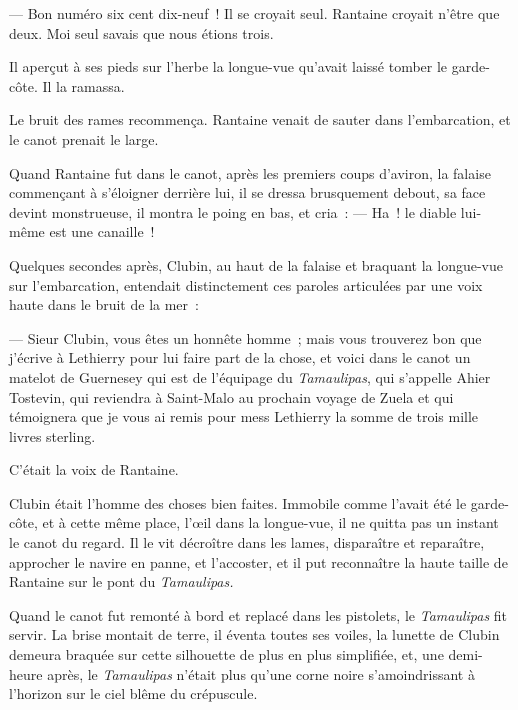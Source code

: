 \documentclass[french,twoside]{book} %
\begin{document}
— Bon numéro six cent dix-neuf ! Il se croyait seul. Rantaine croyait n’être que deux. Moi seul savais que nous étions trois.\par
Il aperçut à ses pieds sur l’herbe la longue-vue qu’avait laissé tomber le garde-côte. Il la ramassa.\par
Le bruit des rames recommença. Rantaine venait de sauter dans l’embarcation, et le canot prenait le large.\par
Quand Rantaine fut dans le canot, après les premiers coups d’aviron, la falaise commençant à s’éloigner derrière lui, il se dressa brusquement debout, sa face devint monstrueuse, il montra le poing en bas, et cria : — Ha ! le diable lui-même est une canaille !\par
Quelques secondes après, Clubin, au haut de la falaise et braquant la longue-vue sur l’embarcation, entendait distinctement ces paroles articulées par une voix haute dans le bruit de la mer :\par
— Sieur Clubin, vous êtes un honnête homme ; mais vous trouverez bon que j’écrive à Lethierry pour lui faire part de la chose, et voici dans le canot un matelot de Guernesey qui est de l’équipage du \emph{Tamaulipas}, qui s’appelle Ahier Tostevin, qui reviendra à Saint-Malo au prochain voyage de Zuela et qui témoignera  que je vous ai remis pour mess Lethierry la somme de trois mille livres sterling.\par
C’était la voix de Rantaine.\par
Clubin était l’homme des choses bien faites. Immobile comme l’avait été le garde-côte, et à cette même place, l’œil dans la longue-vue, il ne quitta pas un instant le canot du regard. Il le vit décroître dans les lames, disparaître et reparaître, approcher le navire en panne, et l’accoster, et il put reconnaître la haute taille de Rantaine sur le pont du \emph{Tamaulipas.}\par
Quand le canot fut remonté à bord et replacé dans les pistolets, le \emph{Tamaulipas} fit servir. La brise montait de terre, il éventa toutes ses voiles, la lunette de Clubin demeura braquée sur cette silhouette de plus en plus simplifiée, et, une demi-heure après, le \emph{Tamaulipas} n’était plus qu’une corne noire s’amoindrissant à l’horizon sur le ciel blême du crépuscule.
\end{document}
